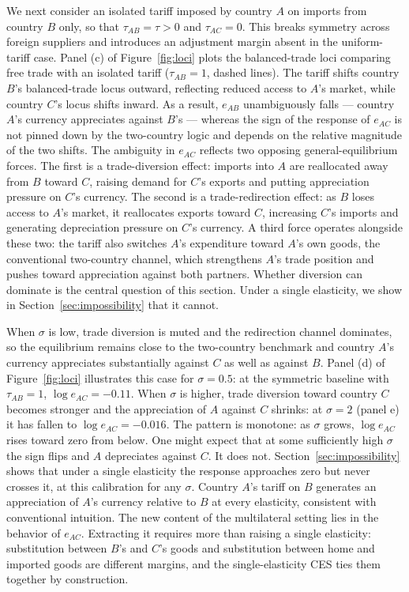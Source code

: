 \documentclass[11pt]{article}
\theoremstyle{plain}
\theoremstyle{remark}
\numberwithin{lemma}{section}
\numberwithin{proposition}{section}
\numberwithin{corollary}{section}
\newcommand{\rev}[1]{{\color{RevBlue}#1}}
\begin{document}
We next consider an isolated tariff imposed by country $A$ on imports from country $B$ only, so that $\tau_{AB} = \tau > 0$ and $\tau_{AC} = 0$. This breaks symmetry across foreign suppliers and introduces an adjustment margin absent in the uniform-tariff case. \rev{Panel (c) of Figure~\ref{fig:loci}} plots the balanced-trade loci comparing free trade with an isolated tariff ($\tau_{AB} = 1$, dashed lines).
The tariff shifts country $B$'s balanced-trade locus outward, reflecting reduced access to $A$'s market, while country $C$'s locus shifts inward. As a result, $e_{AB}$ unambiguously falls — country $A$'s currency appreciates against $B$'s — whereas the sign of the response of $e_{AC}$ is \rev{not pinned down by the two-country logic} and depends on the relative magnitude of the two shifts. The ambiguity in $e_{AC}$ reflects two opposing general-equilibrium forces. The first is a trade-diversion effect: imports into $A$ are reallocated away from $B$ toward $C$, raising demand for $C$'s exports and putting appreciation pressure on $C$'s currency. The second is a trade-redirection effect: as $B$ loses access to $A$'s market, it reallocates exports toward $C$, increasing $C$'s imports and generating depreciation pressure on $C$'s currency. \rev{A third force operates alongside these two: the tariff also switches $A$'s expenditure toward $A$'s own goods, the conventional two-country channel, which strengthens $A$'s trade position and pushes toward appreciation against both partners. Whether diversion can dominate is the central question of this section. Under a single elasticity, we show in Section~\ref{sec:impossibility} that it cannot.}

When $\sigma$ is low, trade diversion is muted and the redirection channel dominates, so the equilibrium remains close to the two-country benchmark and country $A$'s currency \rev{appreciates substantially against $C$ as well as against $B$}.
\rev{Panel (d) of Figure~\ref{fig:loci}} illustrates this case for $\sigma = 0.5$\rev{: at the symmetric baseline with $\tau_{AB} = 1$, $\log e_{AC} = -0.11$. When $\sigma$ is higher, trade diversion toward country $C$ becomes stronger and the appreciation of $A$ against $C$ shrinks: at $\sigma = 2$ (panel e) it has fallen to $\log e_{AC} = -0.016$. The pattern is monotone: as $\sigma$ grows, $\log e_{AC}$ rises toward zero from below. One might expect that at some sufficiently high $\sigma$ the sign flips and $A$ depreciates against $C$. It does not. Section~\ref{sec:impossibility} shows that under a single elasticity the response approaches zero but never crosses it, at this calibration for any $\sigma$.}
\rev{Country $A$'s tariff on $B$ generates an appreciation of $A$'s currency relative to $B$ at every elasticity, consistent with conventional intuition. The new content of the multilateral setting lies in the behavior of $e_{AC}$. Extracting it requires more than raising a single elasticity: substitution between $B$'s and $C$'s goods and substitution between home and imported goods are different margins, and the single-elasticity CES ties them together by construction.}
\end{document}
